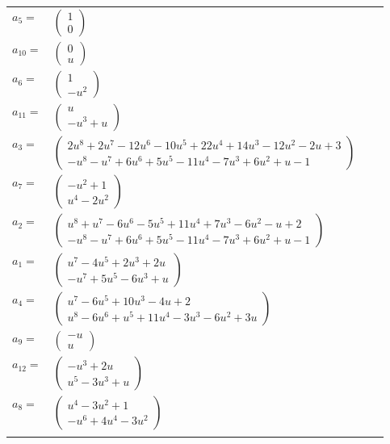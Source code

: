 \documentclass[1p]{elsarticle_modified}
\theoremstyle{definition}
\begin{document}
\begin{tabular}{m{7pt} m{180pt} m{7pt} m{180pt} }
\flushright $a_{5}=$&$\begin{pmatrix}1\\0\end{pmatrix}$ \\
\flushright $a_{10}=$&$\begin{pmatrix}0\\u\end{pmatrix}$ \\
\flushright $a_{6}=$&$\begin{pmatrix}1\\- u^2\end{pmatrix}$ \\
\flushright $a_{11}=$&$\begin{pmatrix}u\\- u^3+u\end{pmatrix}$ \\
\flushright $a_{3}=$&$\begin{pmatrix}2 u^8+2 u^7-12 u^6-10 u^5+22 u^4+14 u^3-12 u^2-2 u+3\\- u^8- u^7+6 u^6+5 u^5-11 u^4-7 u^3+6 u^2+u-1\end{pmatrix}$ \\
\flushright $a_{7}=$&$\begin{pmatrix}- u^2+1\\u^4-2 u^2\end{pmatrix}$ \\
\flushright $a_{2}=$&$\begin{pmatrix}u^8+u^7-6 u^6-5 u^5+11 u^4+7 u^3-6 u^2- u+2\\- u^8- u^7+6 u^6+5 u^5-11 u^4-7 u^3+6 u^2+u-1\end{pmatrix}$ \\
\flushright $a_{1}=$&$\begin{pmatrix}u^7-4 u^5+2 u^3+2 u\\- u^7+5 u^5-6 u^3+u\end{pmatrix}$ \\
\flushright $a_{4}=$&$\begin{pmatrix}u^7-6 u^5+10 u^3-4 u+2\\u^8-6 u^6+u^5+11 u^4-3 u^3-6 u^2+3 u\end{pmatrix}$ \\
\flushright $a_{9}=$&$\begin{pmatrix}- u\\u\end{pmatrix}$ \\
\flushright $a_{12}=$&$\begin{pmatrix}- u^3+2 u\\u^5-3 u^3+u\end{pmatrix}$ \\
\flushright $a_{8}=$&$\begin{pmatrix}u^4-3 u^2+1\\- u^6+4 u^4-3 u^2\end{pmatrix}$\\&\end{tabular}
\end{document}
